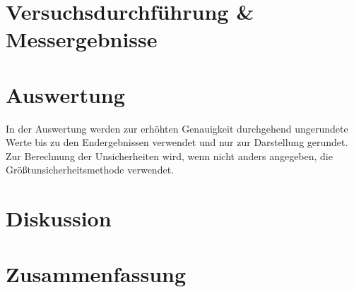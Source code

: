 \documentclass[12pt,a4paper,twoside]{article}
\theoremstyle{definition}
\begin{document}
\section{Versuchsdurchführung \& Messergebnisse}



\section{Auswertung}

In der Auswertung werden zur erhöhten Genauigkeit durchgehend ungerundete Werte bis zu den Endergebnissen verwendet und nur zur Darstellung gerundet. \\
Zur Berechnung der Unsicherheiten wird, wenn nicht anders angegeben, die Größtunsicherheitsmethode verwendet.



\section{Diskussion}



\section{Zusammenfassung}



\printbibliography
{}
\end{document}
